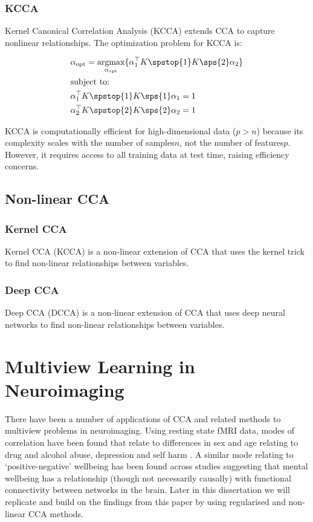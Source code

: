 \subsubsection{KCCA}

Kernel Canonical Correlation Analysis (KCCA) extends CCA to capture nonlinear relationships. The optimization problem for KCCA is:

\begin{align}
    & \alpha_{\text{opt}}=\underset{\alpha_{\text{opt}}}{\mathrm{argmax}}\{ \alpha_1^{\top}K\spstop{1}K\sps{2}\alpha_2  \}\\
    & \text{subject to:} \notag\\
    & \alpha_1^{\top}K\spstop{1}K\sps{1}\alpha_1=1 \notag\\
    & \alpha_2^{\top}K\spstop{2}K\sps{2}\alpha_2=1 \notag
\end{align}


KCCA is computationally efficient for high-dimensional data (\(p>n\)) because its complexity scales with the number of samples\(n\), not the number of features\(p\).
However, it requires access to all training data at test time, raising efficiency concerns.

\subsection{Non-linear CCA}

\subsubsection{Kernel CCA}

Kernel CCA (KCCA) is a non-linear extension of CCA that uses the kernel trick to find non-linear relationships between variables.

\subsubsection{Deep CCA}

Deep CCA (DCCA) is a non-linear extension of CCA that uses deep neural networks to find non-linear relationships between variables.

\section{Multiview Learning in Neuroimaging}

There have been a number of applications of CCA and related methods to multiview problems in neuroimaging.
Using resting state fMRI data, modes of correlation have been found that relate to differences in sex and age relating to drug and alcohol abuse, depression and self harm \cite{mihalik2019brain}.
A similar mode relating to `positive-negative' wellbeing has been found across studies \cite{smith2015positive}suggesting that mental wellbeing has a relationship (though not necessarily causally) with functional connectivity between networks in the brain.
Later in this dissertation we will replicate and build on the findings from this paper by using regularised and non-linear CCA methods.

